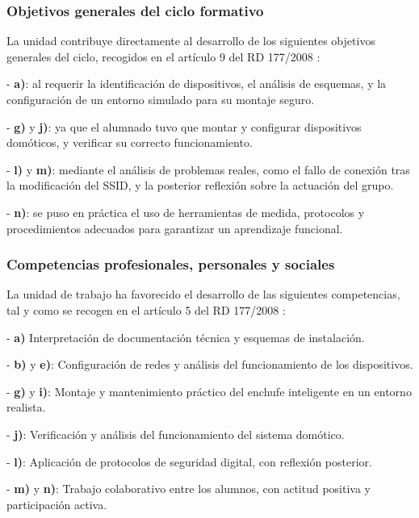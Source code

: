 \subsubsection{Objetivos generales del ciclo formativo}

La unidad contribuye directamente al desarrollo de los siguientes objetivos generales del ciclo, recogidos en el artículo 9 del RD 177/2008 \cite{RD1772008_art9}:

- \textbf{a)}: al requerir la identificación de dispositivos, el análisis de esquemas, y la configuración de un entorno simulado para su montaje seguro.

- \textbf{g)} y \textbf{j)}: ya que el alumnado tuvo que montar y configurar dispositivos domóticos, y verificar su correcto funcionamiento.

- \textbf{l)} y \textbf{m)}: mediante el análisis de problemas reales, como el fallo de conexión tras la modificación del SSID, y la posterior reflexión sobre la actuación del grupo.

- \textbf{n)}: se puso en práctica el uso de herramientas de medida, protocolos y procedimientos adecuados para garantizar un aprendizaje funcional.

\subsubsection{Competencias profesionales, personales y sociales}

La unidad de trabajo ha favorecido el desarrollo de las siguientes competencias, tal y como se recogen en el artículo 5 del RD 177/2008 \cite{RD1772008_art5}:

- \textbf{a)} Interpretación de documentación técnica y esquemas de instalación.

- \textbf{b)} y \textbf{e)}: Configuración de redes y análisis del funcionamiento de los dispositivos.

- \textbf{g)} y \textbf{i)}: Montaje y mantenimiento práctico del enchufe inteligente en un entorno realista.

- \textbf{j)}: Verificación y análisis del funcionamiento del sistema domótico.

- \textbf{l)}: Aplicación de protocolos de seguridad digital, con reflexión posterior.

- \textbf{m)} y \textbf{n)}: Trabajo colaborativo entre los alumnos, con actitud positiva y participación activa.

